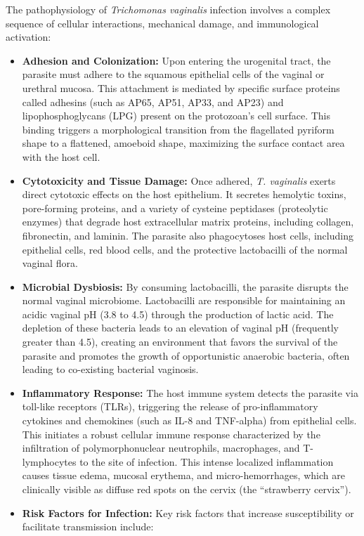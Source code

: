 The pathophysiology of \textit{Trichomonas vaginalis} infection involves a complex sequence of cellular interactions, mechanical damage, and immunological activation:
\begin{itemize}
    \item \textbf{Adhesion and Colonization:} Upon entering the urogenital tract, the parasite must adhere to the squamous epithelial cells of the vaginal or urethral mucosa. This attachment is mediated by specific surface proteins called adhesins (such as AP65, AP51, AP33, and AP23) and lipophosphoglycans (LPG) present on the protozoan's cell surface. This binding triggers a morphological transition from the flagellated pyriform shape to a flattened, amoeboid shape, maximizing the surface contact area with the host cell.
    \item \textbf{Cytotoxicity and Tissue Damage:} Once adhered, \textit{T. vaginalis} exerts direct cytotoxic effects on the host epithelium. It secretes hemolytic toxins, pore-forming proteins, and a variety of cysteine peptidases (proteolytic enzymes) that degrade host extracellular matrix proteins, including collagen, fibronectin, and laminin. The parasite also phagocytoses host cells, including epithelial cells, red blood cells, and the protective lactobacilli of the normal vaginal flora.
    \item \textbf{Microbial Dysbiosis:} By consuming lactobacilli, the parasite disrupts the normal vaginal microbiome. Lactobacilli are responsible for maintaining an acidic vaginal pH (3.8 to 4.5) through the production of lactic acid. The depletion of these bacteria leads to an elevation of vaginal pH (frequently greater than 4.5), creating an environment that favors the survival of the parasite and promotes the growth of opportunistic anaerobic bacteria, often leading to co-existing bacterial vaginosis.
    \item \textbf{Inflammatory Response:} The host immune system detects the parasite via toll-like receptors (TLRs), triggering the release of pro-inflammatory cytokines and chemokines (such as IL-8 and TNF-alpha) from epithelial cells. This initiates a robust cellular immune response characterized by the infiltration of polymorphonuclear neutrophils, macrophages, and T-lymphocytes to the site of infection. This intense localized inflammation causes tissue edema, mucosal erythema, and micro-hemorrhages, which are clinically visible as diffuse red spots on the cervix (the ``strawberry cervix'').
    \item \textbf{Risk Factors for Infection:} Key risk factors that increase susceptibility or facilitate transmission include:

\end{itemize}
